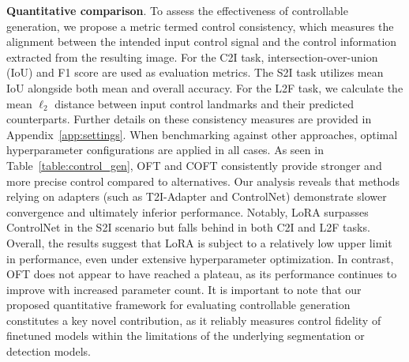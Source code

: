 \textbf{Quantitative comparison}. To assess the effectiveness of controllable generation, we propose a metric termed control consistency, which measures the alignment between the intended input control signal and the control information extracted from the resulting image. For the C2I task, intersection-over-union (IoU) and F1 score are used as evaluation metrics. The S2I task utilizes mean IoU alongside both mean and overall accuracy. For the L2F task, we calculate the mean $\ell_2$ distance between input control landmarks and their predicted counterparts. Further details on these consistency measures are provided in Appendix~\ref{app:settings}. When benchmarking against other approaches, optimal hyperparameter configurations are applied in all cases. As seen in Table~\ref{table:control_gen}, OFT and COFT consistently provide stronger and more precise control compared to alternatives. Our analysis reveals that methods relying on adapters (such as T2I-Adapter and ControlNet) demonstrate slower convergence and ultimately inferior performance. Notably, LoRA surpasses ControlNet in the S2I scenario but falls behind in both C2I and L2F tasks. Overall, the results suggest that LoRA is subject to a relatively low upper limit in performance, even under extensive hyperparameter optimization. In contrast, OFT does not appear to have reached a plateau, as its performance continues to improve with increased parameter count. It is important to note that our proposed quantitative framework for evaluating controllable generation constitutes a key novel contribution, as it reliably measures control fidelity of finetuned models within the limitations of the underlying segmentation or detection models.

